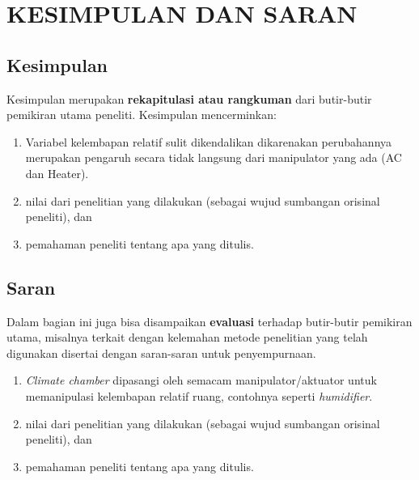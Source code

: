 \chapter{KESIMPULAN DAN SARAN}
\label{kesimpulan-dan-saran}



\section{Kesimpulan}


Kesimpulan merupakan \textbf{rekapitulasi atau rangkuman} dari butir-butir pemikiran utama peneliti. Kesimpulan mencerminkan:
 \begin{enumerate}
 	\item Variabel kelembapan relatif sulit dikendalikan dikarenakan perubahannya merupakan pengaruh secara tidak langsung dari manipulator yang ada (AC dan Heater).
 	\item nilai dari penelitian yang dilakukan (sebagai wujud sumbangan orisinal peneliti), dan
 	\item pemahaman peneliti tentang apa yang ditulis.
 \end{enumerate}
 


\section{Saran}

Dalam bagian ini juga bisa disampaikan \textbf{evaluasi} terhadap butir-butir pemikiran utama, misalnya terkait dengan kelemahan metode penelitian yang telah digunakan disertai dengan saran-saran untuk penyempurnaan.
\begin{enumerate}
	\item \textit{Climate chamber} dipasangi oleh semacam manipulator/aktuator untuk memanipulasi kelembapan relatif ruang, contohnya seperti \textit{humidifier}.
	\item nilai dari penelitian yang dilakukan (sebagai wujud sumbangan orisinal peneliti), dan
	\item pemahaman peneliti tentang apa yang ditulis.
\end{enumerate}

